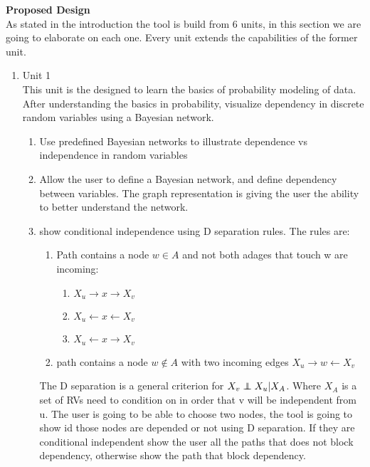 \documentclass{article}
\newcommand\independent{\protect\mathpalette{\protect\independenT}{\perp}}
\def\independenT#1#2{\mathrel{\rlap{$#1#2$}\mkern2mu{#1#2}}}
\begin{document}
    \vspace{0.5cm}

    \textbf{Proposed Design}\\
    As stated in the introduction the tool is build from 6 units, in this section we are going to elaborate on each one. Every unit extends the capabilities of the former unit.
    \begin{enumerate}
        \item Unit 1\\
        This unit is the designed to learn the basics of probability modeling of data. After understanding the basics in probability, visualize
        dependency in discrete random variables using a Bayesian network.
        \begin{enumerate}
            \item Use predefined Bayesian networks to illustrate dependence vs independence in random variables
            \item Allow the user to define a Bayesian network, and define dependency between variables. The graph representation is giving the user the ability to better understand the network.
            \item show conditional independence using D separation rules. The rules are:\\
            \begin{enumerate}
                \item Path contains a node $w \in A$ and not both adages that touch w are incoming:
                \begin{enumerate}
                    \item $X_u \rightarrow x \rightarrow X_v$
                    \item $X_u \leftarrow x \leftarrow X_v$
                    \item $X_u \leftarrow x \rightarrow X_v$
                \end{enumerate}
                \item path contains a node $w\notin A$ with two incoming edges $X_u \rightarrow w \leftarrow X_v$
            \end{enumerate}
            The D separation is a general criterion for $X_v \independent X_u | X_A$. Where $X_A$ is a set of RVs need to condition on in order that v will be independent
            from u.
            The user is going to be able to choose two nodes, the tool is going to show id those nodes are depended or not using D separation. If they are conditional
            independent show the user all the paths that does not block dependency, otherwise show the path that block dependency.\\
        \end{enumerate}


\end{enumerate}
\end{document}

